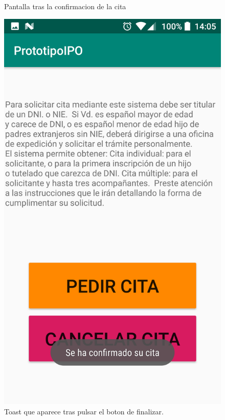 \documentclass[a4paper,11pt]{article}
\begin{document}
\begin{figure}[H]
\begin{minipage}{.45\linewidth}
\caption{Pantalla tras la confirmacion de la cita}
\label{confirmacion1}
\end{minipage}
\begin{minipage}{0.45\linewidth}
\includegraphics[width=\textwidth]{13.png}
\caption{Toast que aparece tras pulsar el boton de finalizar.}
\label{confirmacion2}
\end{minipage}
\end{figure}
\end{document}
